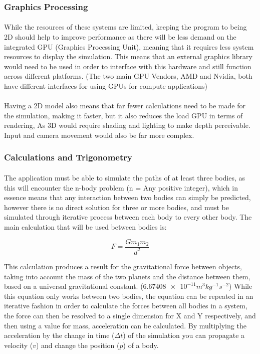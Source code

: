 \subsubsection{Graphics Processing}

\paragraph{}
While the resources of these systems are limited, keeping the program to being 2D should help to improve performance as there will be less demand on the integrated GPU (Graphics Processing Unit), meaning that it requires less system resources to display the simulation. This means that an external graphics library would need to be used in order to interface with this hardware and still function across different platforms. (The two main GPU Vendors, AMD and Nvidia, both have different interfaces for using GPUs for compute applications) 

\paragraph{}
Having a 2D model also means that far fewer calculations need to be made for the simulation, making it faster, but it also reduces the load GPU in terms of rendering, As 3D would require shading and lighting to make depth perceivable. Input and camera movement would also be far more complex.

\subsubsection{Calculations and Trigonometry}
\paragraph{}
The application must be able to simulate the paths of at least three bodies, as this will encounter the n-body problem (n = Any positive integer), which in essence means that any interaction between two bodies can simply be predicted, however there is no direct solution for three or more bodies, and must be simulated through iterative process between each body to every other body.
The main calculation that will be used between bodies is:

$$F=\frac{Gm_1m_2}{d^2}$$

This calculation produces a result for the gravitational force between objects, taking into account the mass of the two planets and the distance between them, based on a universal gravitational constant. ($\num{6.67408e-11} m^{3} kg^{-1} s^{-2}$) 
While this equation only works between two bodies, the equation can be repeated in an iterative fashion in order to calculate the forces between all bodies in a system, the force can then be resolved to a single dimension for X and Y respectively, and then using a value for mass, acceleration can be calculated. By multiplying the acceleration by the change in time ($\Delta t$) of the simulation you can propagate a velocity ($v$) and change the position ($p$) of a body.

